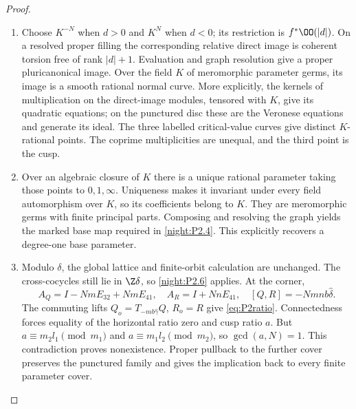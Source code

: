 \begin{proof}
\begin{enumerate}[label=\arabic*.,leftmargin=*]
\item Choose $K^{-N}$ when $d>0$ and $K^N$ when $d<0$; its restriction is $f^*\OO(|d|)$. On a resolved proper filling the corresponding relative direct image is coherent torsion free of rank $|d|+1$. Evaluation and graph resolution give a proper pluricanonical image. Over the field $K$ of meromorphic parameter germs, its image is a smooth rational normal curve. More explicitly, the kernels of multiplication on the direct-image modules, tensored with $K$, give its quadratic equations; on the punctured disc these are the Veronese equations and generate its ideal. The three labelled critical-value curves give distinct $K$-rational points. The coprime multiplicities are unequal, and the third point is the cusp.

\item Over an algebraic closure of $K$ there is a unique rational parameter taking those points to $0,1,\infty$. Uniqueness makes it invariant under every field automorphism over $K$, so its coefficients belong to $K$. They are meromorphic germs with finite principal parts. Composing and resolving the graph yields the marked base map required in \ref{night:P2.4}. This explicitly recovers a degree-one base parameter.

\item Modulo $\delta$, the global lattice and finite-orbit calculation are unchanged. The cross-cocycles still lie in $\Z\delta$, so \ref{night:P2.6} applies. At the corner,
\[
 A_Q=I-NmE_{32}+NmE_{41},\quad A_R=I+NnE_{41},\quad [Q,R]=-Nmnb\widehat\delta.
\]
The commuting lifts $Q_o=T_{-mb\widehat\gamma}Q$, $R_o=R$ give \eqref{eq:P2ratio}. Connectedness forces equality of the horizontal ratio zero and cusp ratio $a$. But $a\equiv m_2l_1\pmod{m_1}$ and $a\equiv m_1l_2\pmod{m_2}$, so $\gcd(a,N)=1$. This contradiction proves nonexistence. Proper pullback to the further cover preserves the punctured family and gives the implication back to every finite parameter cover.
\end{enumerate}
\end{proof}
